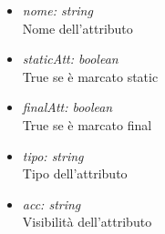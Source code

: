 \begin{itemize}
\begin{itemize}
\begin{itemize}
    			\item \emph{nome: string}\\
    			Nome dell'attributo
    			\item \emph{staticAtt: boolean}\\
    			True se è marcato static
    			\item \emph{finalAtt: boolean}\\
    			True se è marcato final
    			\item \emph{tipo: string}\\
    			Tipo dell'attributo
    			\item \emph{acc: string}\\
    			Visibilità dell'attributo
    		\end{itemize}
		\end{itemize}
\end{itemize}